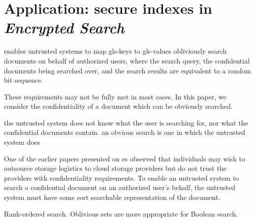 \documentclass[ ../main.tex]{subfiles}
\begin{document}
\section{Application: secure indexes in \emph{Encrypted Search}}
enables untrusted systems to map \glspl{gls-key} to \glspl{gls-value}
obliviously search documents on behalf of authorized users, where the search query, the confidential documents being searched over, and the search results are equivalent to a random bit sequence.

These requirements may not be fully met in most cases. In this paper, we consider the confidentiality of a document which can be obviously searched.

the untrusted system does not know what the user is searching for, nor what the confidential documents contain. an obvious search is one in which the untrusted system does

One of the earlier papers presented on \gls{es} \cite{Son00} observed that individuals may wish to outsource storage logistics to cloud storage providers but do not trust the providers with confidentiality requirements. 
To enable an untrusted system to search a confidential document on an authorized user's behalf, the untrusted system must have some sort searchable representation of the document. 

Rank-ordered search. Oblivious sets are more appropriate for Boolean search.
\end{document}
